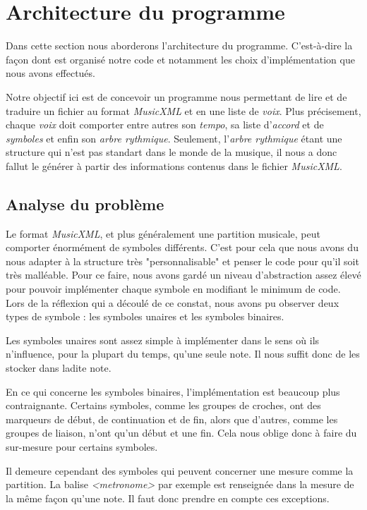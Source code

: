 \section{Architecture du programme}

\par
Dans cette section nous aborderons l'architecture du programme. C'est-à-dire la façon dont est organisé notre code et notamment les choix d’implémentation que nous avons effectués.

\par
Notre objectif ici est de concevoir un programme nous permettant de lire et de traduire un fichier au format \emph{MusicXML} et en une liste de \emph{voix}. Plus précisement, chaque \emph{voix} doit comporter entre autres son \emph{tempo}, sa liste d'\emph{accord} et de \emph{symboles} et enfin son \emph{arbre rythmique}. Seulement, l'\emph{arbre rythmique} étant une structure qui n'est pas standart dans le monde de la musique, il nous a donc fallut le générer à partir des informations contenus dans le fichier \emph{MusicXML}.


\subsection{Analyse du problème}

\par
Le format \emph{MusicXML}, et plus généralement une partition musicale, peut comporter énormément de symboles différents. C'est pour cela que nous avons du nous adapter à la structure très "personnalisable" et penser le code pour qu'il soit très malléable. Pour ce faire, nous avons gardé un niveau d'abstraction assez élevé pour pouvoir implémenter chaque symbole en modifiant le minimum de code. Lors de la réflexion qui a découlé de ce constat, nous avons pu observer deux types de symbole : les symboles unaires et les symboles binaires.
\par
Les symboles unaires sont assez simple à implémenter dans le sens où ils n'influence, pour la plupart du temps, qu'une seule note. Il nous suffit donc de les stocker dans ladite note.
\par
En ce qui concerne les symboles binaires, l'implémentation est beaucoup plus contraignante. Certains symboles, comme les groupes de croches, ont des marqueurs de début, de continuation et de fin, alors que d'autres, comme les groupes de liaison, n'ont qu'un début et une fin. Cela nous oblige donc à faire du sur-mesure pour certains symboles.
\par
Il demeure cependant des symboles qui peuvent concerner une mesure comme la partition. La balise \emph{<metronome>} par exemple est renseignée dans la mesure de la même façon qu'une note. Il faut donc prendre en compte ces exceptions.


